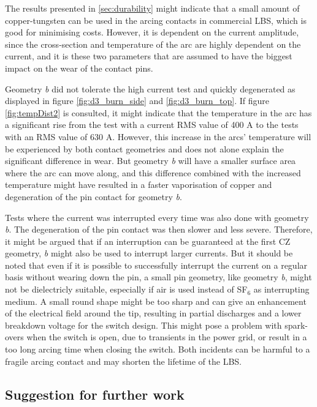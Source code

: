 \documentclass[10pt,a4paper,twoside]{article}
\begin{document}
The results presented in \ref{sec:durability} might indicate that a small amount of copper-tungsten can be used in the arcing contacts in commercial LBS, which is good for minimising costs. However, it is dependent on the current amplitude, since the cross-section and temperature of the arc are highly dependent on the current, and it is these two parameters that are assumed to have the biggest impact on the wear of the contact pins. 

Geometry \textit{b} did not tolerate the high current test and quickly degenerated as displayed in figure \ref{fig:d3_burn_side} and \ref{fig:d3_burn_top}. If figure \ref{fig:tempDist2} is consulted, it might indicate that the temperature in the arc has a significant rise from the test with a current RMS value of 400 A to the tests with an RMS value of 630 A. However, this increase in the arcs' temperature will be experienced by both contact geometries and does not alone explain the significant difference in wear. But geometry \textit{b} will have a smaller surface area where the arc can move along, and this difference combined with the increased temperature might have resulted in a faster vaporisation of copper and degeneration of the pin contact for geometry \textit{b}.

Tests where the current was interrupted every time was also done with geometry \textit{b}. The degeneration of the pin contact was then slower and less severe. Therefore, it might be argued that if an interruption can be guaranteed at the first CZ geometry, \textit{b} might also be used to interrupt larger currents. But it should be noted that even if it is possible to successfully interrupt the current on a regular basis without wearing down the pin, a small pin geometry, like geometry \textit{b}, might not be dielectricly suitable, especially if air is used instead of SF$_6$ as interrupting medium. A small round shape might be too sharp and can give an enhancement of the electrical field around the tip, resulting in partial discharges and a lower breakdown voltage for the switch design. This might pose a problem with spark-overs when the switch is open, due to transients in the power grid, or result in a too long arcing time when closing the switch. Both incidents can be harmful to a fragile arcing contact and may shorten the lifetime of the LBS.
\newpage
\subsection{Suggestion for further work}
\end{document}
